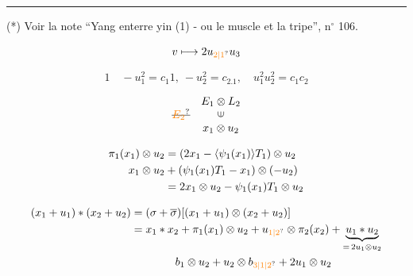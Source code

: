 \noindent\rule{.22\linewidth}{.4pt}\par
(*) Voir la note ``Yang enterre yin (1) - ou le muscle et la tripe'', n$^\circ$ 106.



\[ v\longmapsto 2u_{\unsure{2|1}}u_3 \]

\[1\quad -u_1^2=c_1 1,\ -u_2^2=c_2.1,\quad u_1^2u_2^2=c_1c_2 \]


\[ \deleted{\unsure{E_2}}\quad\begin{matrix} E_1\otimes L_2\\ \rotatebox{90}{$\in$}\\x_1\otimes u_2\end{matrix} \]

\[
\begin{aligned}
\pi_1(x_1)\otimes u_2&=(2x_1-\inserted{\psi_1(x_1)}T_1)\otimes u_2\\
x_1\otimes u_2&+(\psi_1(x_1)T_1-x_1)\otimes(-u_2)\\
&=2x_1\otimes u_2-\psi_1(x_1)T_1\otimes u_2
\end{aligned}
\]


\[
\begin{aligned}
(x_1+u_1)*(x_2+u_2)&=(\sigma+\overline{\sigma})[(x_1+u_1)\otimes(x_2+u_2)]\\
&=x_1*x_2+\pi_1(x_1)\otimes u_2+u_{\unsure{1|2}}\otimes\pi_2(x_2)+\underbrace{u_1*u_2}_{=\,2u_1\otimes u_2}\\
&\hspace{4em}b_1\otimes u_2+u_2\otimes b_{\unsure{3|1|2}}+2u_1\otimes u_2
\end{aligned}
\]

